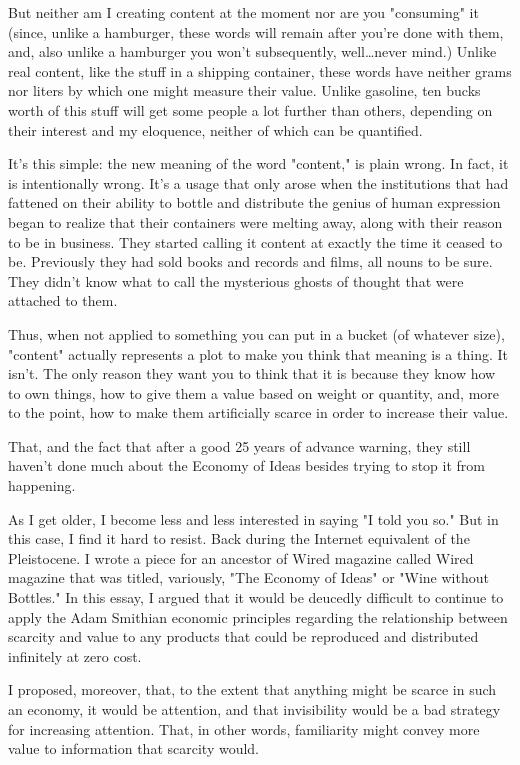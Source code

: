 But neither am I creating content at the moment nor are you
"consuming" it (since, unlike a hamburger, these words will remain
after you're done with them, and, also unlike a hamburger you won't
subsequently, well\ldots never mind.) Unlike real content, like the
stuff in a shipping container, these words have neither grams nor
liters by which one might measure their value. Unlike gasoline, ten
bucks worth of this stuff will get some people a lot further than
others, depending on their interest and my eloquence, neither of
which can be quantified.

It's this simple: the new meaning of the word "content," is plain
wrong. In fact, it is intentionally wrong. It's a usage that only
arose when the institutions that had fattened on their ability to
bottle and distribute the genius of human expression began to
realize that their containers were melting away, along with their
reason to be in business. They started calling it content at
exactly the time it ceased to be. Previously they had sold books
and records and films, all nouns to be sure. They didn't know what
to call the mysterious ghosts of thought that were attached to
them.

Thus, when not applied to something you can put in a bucket (of
whatever size), "content" actually represents a plot to make you
think that meaning is a thing. It isn't. The only reason they want
you to think that it is because they know how to own things, how to
give them a value based on weight or quantity, and, more to the
point, how to make them artificially scarce in order to increase
their value.

That, and the fact that after a good 25 years of advance warning,
they still haven't done much about the Economy of Ideas besides
trying to stop it from happening.

As I get older, I become less and less interested in saying "I told
you so." But in this case, I find it hard to resist. Back during
the Internet equivalent of the Pleistocene. I wrote a piece for an
ancestor of Wired magazine called Wired magazine that was titled,
variously, "The Economy of Ideas" or "Wine without Bottles." In
this essay, I argued that it would be deucedly difficult to
continue to apply the Adam Smithian economic principles regarding
the relationship between scarcity and value to any products that
could be reproduced and distributed infinitely at zero cost.

I proposed, moreover, that, to the extent that anything might be
scarce in such an economy, it would be attention, and that
invisibility would be a bad strategy for increasing attention.
That, in other words, familiarity might convey more value to
information that scarcity would.

